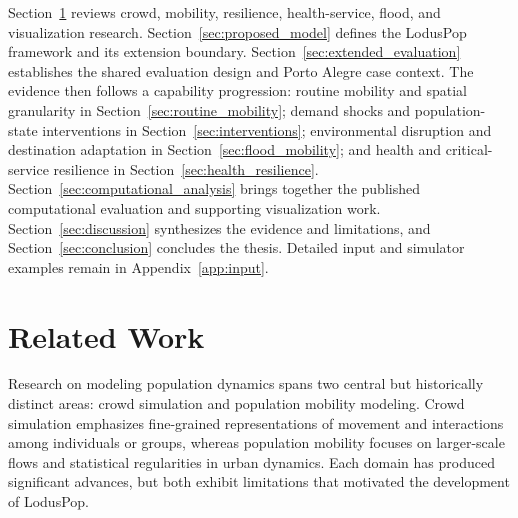 \documentclass[pdflatex,sn-mathphys-num]{sn-jnl}%
\newcommand\blue[1]{#1}
\theoremstyle{thmstyleone}%
\theoremstyle{thmstyletwo}%
\theoremstyle{thmstylethree}%
\begin{document}
Section~\ref{sec:related_work} reviews crowd, mobility, resilience, health-service, flood, and visualization research. Section~\ref{sec:proposed_model} defines the LodusPop framework and its extension boundary. Section~\ref{sec:extended_evaluation} establishes the shared evaluation design and Porto Alegre case context. The evidence then follows a capability progression: routine mobility and spatial granularity in Section~\ref{sec:routine_mobility}; demand shocks and population-state interventions in Section~\ref{sec:interventions}; environmental disruption and destination adaptation in Section~\ref{sec:flood_mobility}; and health and critical-service resilience in Section~\ref{sec:health_resilience}. Section~\ref{sec:computational_analysis} brings together the published computational evaluation and supporting visualization work. Section~\ref{sec:discussion} synthesizes the evidence and limitations, and Section~\ref{sec:conclusion} concludes the thesis. Detailed input and simulator examples remain in Appendix~\ref{app:input}.



\section{Related Work}
\label{sec:related_work}

\blue{Research on modeling population dynamics spans two central but historically distinct areas: crowd simulation and population mobility modeling. Crowd simulation emphasizes fine-grained representations of movement and interactions among individuals or groups, whereas population mobility focuses on larger-scale flows and statistical regularities in urban dynamics. Each domain has produced significant advances, but both exhibit limitations that motivated the development of LodusPop.}
\end{document}
